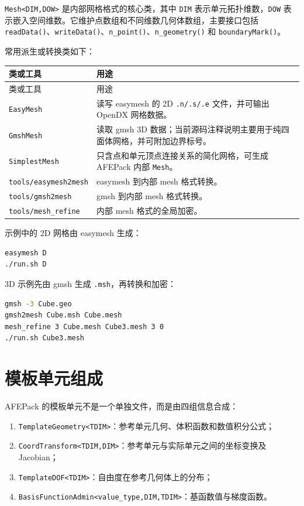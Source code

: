 \documentclass[UTF8,openany,zihao=-4,scheme=chinese]{ctexbook}
\newcommand{\file}[1]{\nolinkurl{#1}}
\newcommand{\class}[1]{\texttt{#1}}
\begin{document}
\class{Mesh<DIM,DOW>} 是内部网格格式的核心类，其中 \class{DIM} 表示单元拓扑维数，\class{DOW} 表示嵌入空间维数。它维护点数组和不同维数几何体数组，主要接口包括 \class{readData()}、\class{writeData()}、\class{n\_point()}、\class{n\_geometry()} 和 \class{boundaryMark()}。

常用派生或转换类如下：

\begin{longtable}{p{}p{}}
\toprule
类或工具 & 用途\\
\midrule
\endfirsthead
\toprule
类或工具 & 用途\\
\midrule
\endhead
\class{EasyMesh} & 读写 easymesh 的 2D \file{.n/.s/.e} 文件，并可输出 OpenDX 网格数据。\\
\class{GmshMesh} & 读取 gmsh 3D 数据；当前源码注释说明主要用于纯四面体网格，并可附加边界标号。\\
\class{SimplestMesh} & 只含点和单元顶点连接关系的简化网格，可生成 AFEPack 内部 \class{Mesh}。\\
\file{tools/easymesh2mesh} & easymesh 到内部 mesh 格式转换。\\
\file{tools/gmsh2mesh} & gmsh 到内部 mesh 格式转换。\\
\file{tools/mesh_refine} & 内部 mesh 格式的全局加密。\\
\bottomrule
\end{longtable}

示例中的 2D 网格由 easymesh 生成：

\begin{lstlisting}[language=bash]
easymesh D
./run.sh D
\end{lstlisting}

3D 示例先由 gmsh 生成 \file{.msh}，再转换和加密：

\begin{lstlisting}[language=bash]
gmsh -3 Cube.geo
gmsh2mesh Cube.msh Cube.mesh
mesh_refine 3 Cube.mesh Cube3.mesh 3 0
./run.sh Cube3.mesh
\end{lstlisting}

\section{模板单元组成}

AFEPack 的模板单元不是一个单独文件，而是由四组信息合成：

\begin{enumerate}[leftmargin=2em]
  \item \class{TemplateGeometry<TDIM>}：参考单元几何、体积函数和数值积分公式；
  \item \class{CoordTransform<TDIM,DIM>}：参考单元与实际单元之间的坐标变换及 Jacobian；
  \item \class{TemplateDOF<TDIM>}：自由度在参考几何体上的分布；
  \item \class{BasisFunctionAdmin<value\_type,DIM,TDIM>}：基函数值与梯度函数。
\end{enumerate}
\end{document}
